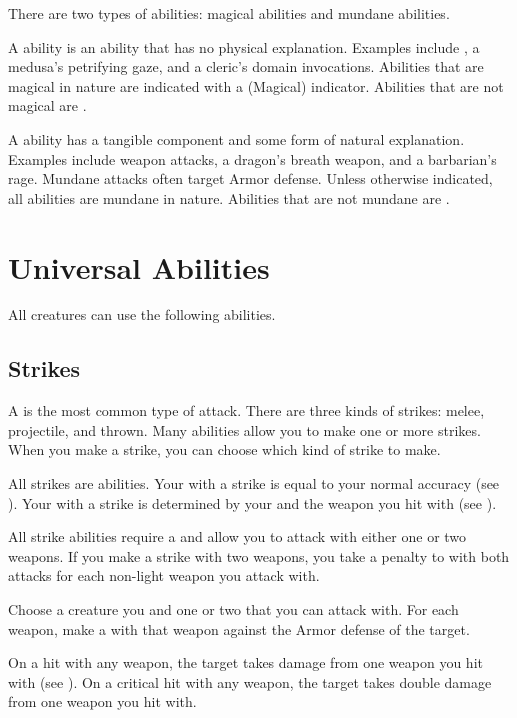         There are two types of abilities: magical abilities and mundane abilities.

        \label{Magical Abilities} A  ability is an ability that has no physical explanation.
        Examples include , a medusa's petrifying gaze, and a cleric's domain invocations.
        Abilities that are magical in nature are indicated with a (Magical) indicator.
        Abilities that are not magical are .

        \label{Mundane Abilities} A  ability has a tangible component and some form of natural explanation.
        Examples include weapon attacks, a dragon's breath weapon, and a barbarian's rage.
        Mundane attacks often target Armor defense.
        Unless otherwise indicated, all abilities are mundane in nature.
        Abilities that are not mundane are .

\section{Universal Abilities}\label{Universal Abilities}
    All creatures can use the following abilities.

    \subsection{Strikes}\label{Strikes}
        A  is the most common type of attack.
        There are three kinds of strikes: melee, projectile, and thrown.
        Many abilities allow you to make one or more strikes.
        When you make a strike, you can choose which kind of strike to make.

        All strikes are  abilities.
        Your  with a strike is equal to your normal accuracy (see ).
        Your  with a strike is determined by your  and the weapon you hit with (see ).

        \label{Two-Weapon Strikes}
        All strike abilities require a  and allow you to attack with either one or two weapons.
        If you make a strike with two weapons, you take a  penalty to  with both attacks for each non-light weapon you attack with.

        \begin{freeability}{}
            Choose a creature you  and one or two  that you can attack with.
            For each weapon, make a  with that weapon against the Armor defense of the target.

            On a hit with any weapon, the target takes damage from one weapon you hit with (see ).
            On a critical hit with any weapon, the target takes double damage from one weapon you hit with.
        \end{freeability}

